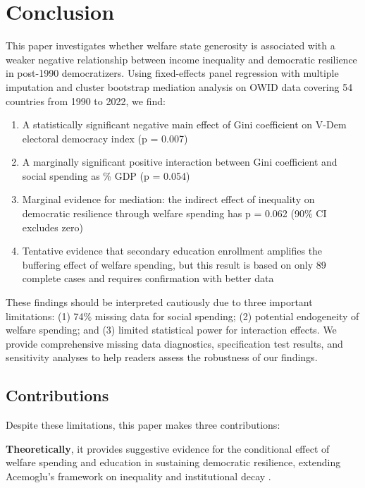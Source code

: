 \documentclass[11pt,letterpaper]{article}
\begin{document}
\section{Conclusion}

This paper investigates whether welfare state generosity is associated with a weaker negative relationship between income inequality and democratic resilience in post-1990 democratizers. Using fixed-effects panel regression with multiple imputation and cluster bootstrap mediation analysis on OWID data covering 54 countries from 1990 to 2022, we find:

\begin{enumerate}
  \item A statistically significant negative main effect of Gini coefficient on V-Dem electoral democracy index (p = 0.007)
  \item A marginally significant positive interaction between Gini coefficient and social spending as \% GDP (p = 0.054)
  \item Marginal evidence for mediation: the indirect effect of inequality on democratic resilience through welfare spending has p = 0.062 (90\% CI excludes zero)
  \item Tentative evidence that secondary education enrollment amplifies the buffering effect of welfare spending, but this result is based on only 89 complete cases and requires confirmation with better data
\end{enumerate}

These findings should be interpreted cautiously due to three important limitations: (1) 74\% missing data for social spending; (2) potential endogeneity of welfare spending; and (3) limited statistical power for interaction effects. We provide comprehensive missing data diagnostics, specification test results, and sensitivity analyses to help readers assess the robustness of our findings.

\subsection{Contributions}

Despite these limitations, this paper makes three contributions:

\textbf{Theoretically}, it provides suggestive evidence for the conditional effect of welfare spending and education in sustaining democratic resilience, extending Acemoglu's framework on inequality and institutional decay \cite{Acemoglu2019}.
\end{document}
